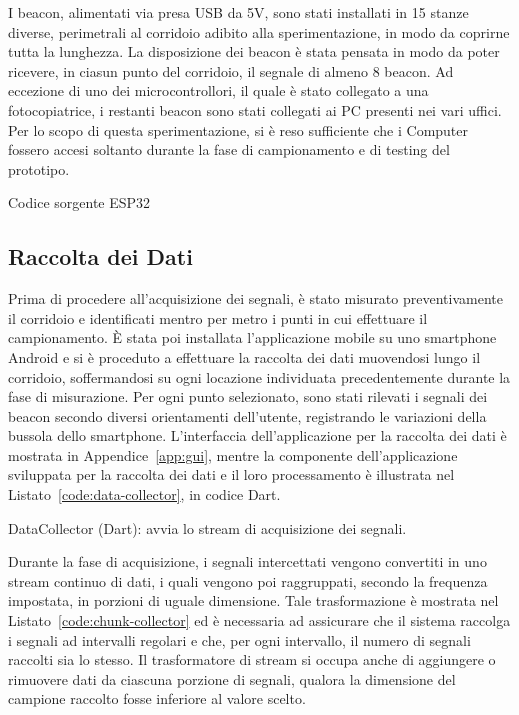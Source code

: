 I beacon, alimentati via presa USB da 5V, sono stati installati in 15 stanze
diverse, perimetrali al corridoio adibito alla sperimentazione, in modo da
coprirne tutta la lunghezza. La disposizione dei beacon è stata pensata in modo
da poter ricevere, in ciasun punto del corridoio, il segnale di almeno 8
beacon. Ad eccezione di uno dei microcontrollori, il quale è stato collegato a
una fotocopiatrice, i restanti beacon sono stati collegati ai PC presenti nei
vari uffici. Per lo scopo di questa sperimentazione, si è reso sufficiente che
i Computer fossero accesi soltanto durante la fase di campionamento e di
testing del prototipo.

\begin{listing}[htp]
	\caption{Codice sorgente ESP32}
	\label{code:esp32}
\end{listing}

\subsection{Raccolta dei Dati}
Prima di procedere all'acquisizione dei segnali, è stato misurato
preventivamente il corridoio e identificati mentro per metro i punti in cui
effettuare il campionamento. È stata poi installata l'applicazione mobile su
uno smartphone Android e si è proceduto a effettuare la raccolta dei dati
muovendosi lungo il corridoio, soffermandosi su ogni locazione individuata
precedentemente durante la fase di misurazione. Per ogni punto selezionato,
sono stati rilevati i segnali dei beacon secondo diversi orientamenti
dell'utente, registrando le variazioni della bussola dello smartphone.
L'interfaccia dell'applicazione per la raccolta dei dati è mostrata in
Appendice~\ref{app:gui}, mentre la componente dell'applicazione sviluppata per
la raccolta dei dati e il loro processamento è illustrata nel
Listato~\ref{code:data-collector}, in codice Dart.
\begin{listing}[H]
	\caption{DataCollector (Dart): avvia lo stream di acquisizione dei segnali.}
  \label{code:data-collector}
\end{listing}

Durante la fase di acquisizione, i segnali intercettati vengono convertiti in
uno stream continuo di dati, i quali vengono poi raggruppati, secondo la
frequenza impostata, in porzioni di uguale dimensione. Tale trasformazione è
mostrata nel Listato~\ref{code:chunk-collector} ed è necessaria ad assicurare
che il sistema raccolga i segnali ad intervalli regolari e che, per ogni
intervallo, il numero di segnali raccolti sia lo stesso. Il trasformatore di
stream si occupa anche di aggiungere o rimuovere dati da ciascuna porzione di
segnali, qualora la dimensione del campione raccolto fosse inferiore al valore
scelto.

